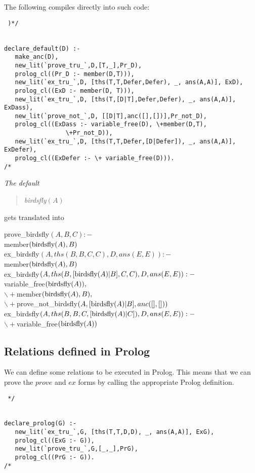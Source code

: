The following compiles directly into such code:
\begin{verbatim} )*/


declare_default(D) :-
   make_anc(D),
   new_lit(`prove_tru_`,D,[T,_],Pr_D),
   prolog_cl((Pr_D :- member(D,T))),
   new_lit(`ex_tru_`,D, [ths(T,T,Defer,Defer), _, ans(A,A)], ExD),
   prolog_cl((ExD :- member(D, T))),
   new_lit(`ex_tru_`,D, [ths(T,[D|T],Defer,Defer), _, ans(A,A)], ExDass),
   new_lit(`prove_not_`,D, [[D|T],anc([],[])],Pr_not_D),
   prolog_cl((ExDass :- variable_free(D), \+member(D,T),
                 \+Pr_not_D)),
   new_lit(`ex_tru_`,D, [ths(T,T,Defer,[D|Defer]), _, ans(A,A)], ExDefer),
   prolog_cl((ExDefer :- \+ variable_free(D))).
/* \end{verbatim}

\begin{example}\em
The default
\begin{quote} \em
birdsfly$(A)$
\end{quote}
gets translated into \em
\begin{prolog}
prove\_birdsfly$(A,B,C):-$\\
\>member$(\hbox{birdsfly}(A),B)$\\
ex\_birdsfly$(A,ths(B,B,C,C),D,ans(E,E)):-$\\
\>member$(\hbox{birdsfly}(A),B)$\\
ex\_birdsfly$(A,ths(B,[\hbox{birdsfly}(A)|B],C,C),D,ans(E,E)):-$\\
\>variable\_free$(\hbox{birdsfly}(A)) ,$\\
\>$\backslash+$member$(\hbox{birdsfly}(A),B),$\\
\>$\backslash+$prove\_not\_birdsfly$(A,[\hbox{birdsfly}(A)|B],anc([],[]))$\\
ex\_birdsfly$(A,ths(B,B,C,[\hbox{birdsfly}(A)|C]),D,ans(E,E)):- $\\
\>$\backslash+$variable\_free$(\hbox{birdsfly}( A))$
\end{prolog}
\end{example}
\subsection{Relations defined in Prolog}
We can define some relations to be executed in Prolog.
This means that we can prove the $prove$ and $ex$ forms by calling 
the appropriate Prolog definition.
\begin{verbatim} */
            

declare_prolog(G) :-
   new_lit(`ex_tru_`,G, [ths(T,T,D,D), _, ans(A,A)], ExG),
   prolog_cl((ExG :- G)),
   new_lit(`prove_tru_`,G,[_,_],PrG),
   prolog_cl((PrG :- G)).
/* \end{verbatim}

